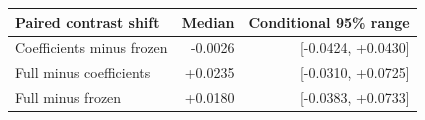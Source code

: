 \begin{tabular}{lrr}
\toprule
Paired contrast shift & Median & Conditional 95\% range \\
\midrule
Coefficients minus frozen & -0.0026 & [-0.0424, +0.0430] \\
Full minus coefficients & +0.0235 & [-0.0310, +0.0725] \\
Full minus frozen & +0.0180 & [-0.0383, +0.0733] \\
\bottomrule
\end{tabular}
